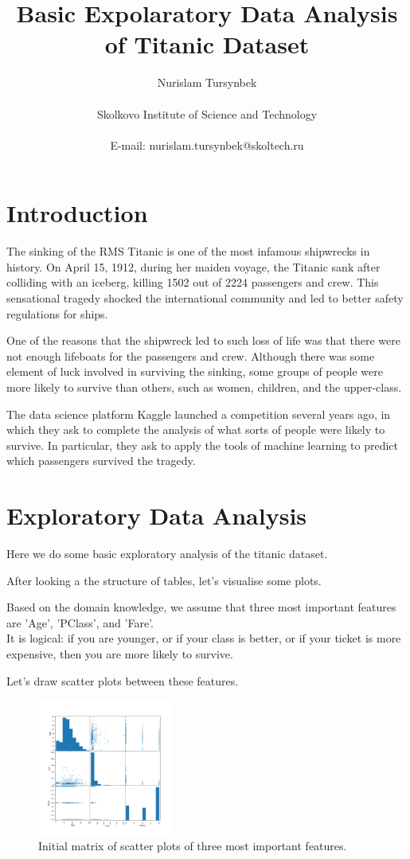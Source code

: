 \documentclass[12pt]{article}
\title{Basic Expolaratory Data Analysis of Titanic Dataset}
\author
{Nurislam Tursynbek\\
\\
\normalsize{Skolkovo Institute of Science and Technology}\\
\\
\normalsize{E-mail:  nurislam.tursynbek@skoltech.ru}
}
\date{}
\begin{document}
 

\maketitle 

\newpage

\section{Introduction}

The sinking of the RMS Titanic is one of the most infamous shipwrecks in history.  On April 15, 1912, during her maiden voyage, the Titanic sank after colliding with an iceberg, killing 1502 out of 2224 passengers and crew. This sensational tragedy shocked the international community and led to better safety regulations for ships.

One of the reasons that the shipwreck led to such loss of life was that there were not enough lifeboats for the passengers and crew. Although there was some element of luck involved in surviving the sinking, some groups of people were more likely to survive than others, such as women, children, and the upper-class.

The data science platform Kaggle launched a competition several years ago, in which they ask to complete the analysis of what sorts of people were likely to survive. In particular, they ask to apply the tools of machine learning to predict which passengers survived the tragedy.

\section{Exploratory Data Analysis}

Here we do some basic exploratory analysis of the titanic dataset.

After looking a the structure of tables, let's visualise some plots.

Based on the domain knowledge, we assume that three most important features are 'Age', 'PClass', and 'Fare'. \\
It is logical: if you are younger, or if your class is better, or if your ticket is more expensive, then you are more likely to survive.

Let's draw scatter plots between these features.

\begin{figure}[ht!]
    \centering
    \includegraphics[width=0.4\textwidth]{figs/figure_1.png}
    \caption{Initial matrix of scatter plots of three most important features.}
\end{figure}
\end{document}
